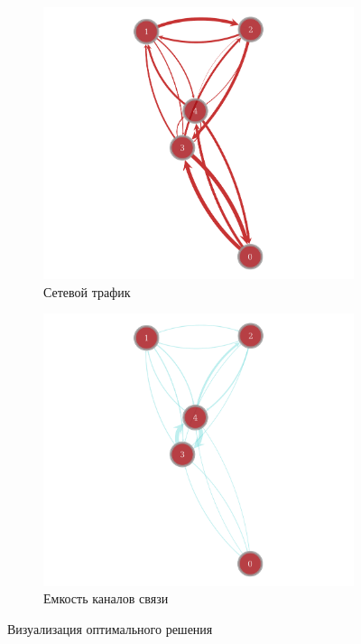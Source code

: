 \documentclass[14pt,a4paper,titlepage]{extarticle}
\begin{document}
\begin{figure}[h]
\centering
    \begin{subfigure}{0.49\textwidth}
        \includegraphics[width=\textwidth]{optimized_mu}
        \caption{Сетевой трафик}
        \label{fig:optimized_mu}
    \end{subfigure}
    \begin{subfigure}{0.49\textwidth}
        \includegraphics[width=\textwidth]{optimized_lambda}
        \caption{Емкость каналов связи}
        \label{fig:optimized_lambda}
    \end{subfigure}
    \caption{Визуализация оптимального решения}\label{fig:optimized_solution}
\end{figure}
\end{document}
